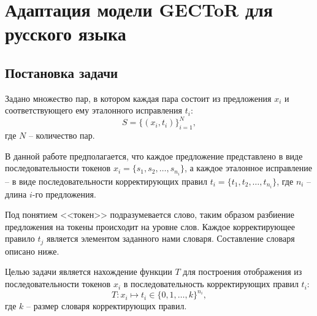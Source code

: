 \newpage

\section{Адаптация модели GECToR для русского языка}
\subsection{Постановка задачи}

Задано множество пар, в котором каждая пара состоит из предложения \( x_i \) и соответствующего ему эталонного исправления \( t_i \):
\[
S = \{(x_i, t_i)\}_{i=1}^N,
\]
где \( N \) – количество пар. 

В данной работе предполагается, что каждое предложение представлено в виде последовательности токенов \( x_i = \{s_1, s_2, \dots, s_{n_i}\} \), а каждое эталонное исправление – в виде последовательности корректирующих правил \( t_i = \{t_1, t_2, \dots, t_{n_i}\} \), где \( n_i \) – длина \( i \)-го предложения. 

Под понятием <<токен>> подразумевается слово, таким образом разбиение предложения на токены происходит на уровне слов. Каждое корректирующее правило \( t_j \) является элементом заданного нами словаря. Составление словаря описано ниже.

Целью задачи является нахождение функции \( T \) для построения отображения из последовательности токенов \( x_i \) в последовательность корректирующих правил \( t_i \):
\[
T: x_i \mapsto t_i \in \{0, 1, \dots, k\}^{n_i},
\]
где \( k \) – размер словаря корректирующих правил.
 

